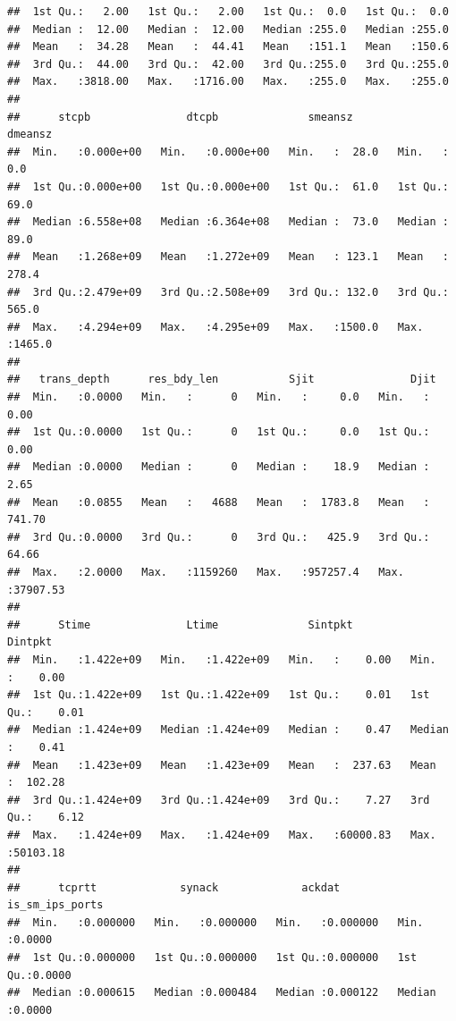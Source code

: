 \documentclass[
]{article}
\begin{document}
\begin{verbatim}
##  1st Qu.:   2.00   1st Qu.:   2.00   1st Qu.:  0.0   1st Qu.:  0.0  
##  Median :  12.00   Median :  12.00   Median :255.0   Median :255.0  
##  Mean   :  34.28   Mean   :  44.41   Mean   :151.1   Mean   :150.6  
##  3rd Qu.:  44.00   3rd Qu.:  42.00   3rd Qu.:255.0   3rd Qu.:255.0  
##  Max.   :3818.00   Max.   :1716.00   Max.   :255.0   Max.   :255.0  
##                                                                     
##      stcpb               dtcpb              smeansz          dmeansz      
##  Min.   :0.000e+00   Min.   :0.000e+00   Min.   :  28.0   Min.   :   0.0  
##  1st Qu.:0.000e+00   1st Qu.:0.000e+00   1st Qu.:  61.0   1st Qu.:  69.0  
##  Median :6.558e+08   Median :6.364e+08   Median :  73.0   Median :  89.0  
##  Mean   :1.268e+09   Mean   :1.272e+09   Mean   : 123.1   Mean   : 278.4  
##  3rd Qu.:2.479e+09   3rd Qu.:2.508e+09   3rd Qu.: 132.0   3rd Qu.: 565.0  
##  Max.   :4.294e+09   Max.   :4.295e+09   Max.   :1500.0   Max.   :1465.0  
##                                                                           
##   trans_depth      res_bdy_len           Sjit               Djit         
##  Min.   :0.0000   Min.   :      0   Min.   :     0.0   Min.   :    0.00  
##  1st Qu.:0.0000   1st Qu.:      0   1st Qu.:     0.0   1st Qu.:    0.00  
##  Median :0.0000   Median :      0   Median :    18.9   Median :    2.65  
##  Mean   :0.0855   Mean   :   4688   Mean   :  1783.8   Mean   :  741.70  
##  3rd Qu.:0.0000   3rd Qu.:      0   3rd Qu.:   425.9   3rd Qu.:   64.66  
##  Max.   :2.0000   Max.   :1159260   Max.   :957257.4   Max.   :37907.53  
##                                                                          
##      Stime               Ltime              Sintpkt            Dintpkt        
##  Min.   :1.422e+09   Min.   :1.422e+09   Min.   :    0.00   Min.   :    0.00  
##  1st Qu.:1.422e+09   1st Qu.:1.422e+09   1st Qu.:    0.01   1st Qu.:    0.01  
##  Median :1.424e+09   Median :1.424e+09   Median :    0.47   Median :    0.41  
##  Mean   :1.423e+09   Mean   :1.423e+09   Mean   :  237.63   Mean   :  102.28  
##  3rd Qu.:1.424e+09   3rd Qu.:1.424e+09   3rd Qu.:    7.27   3rd Qu.:    6.12  
##  Max.   :1.424e+09   Max.   :1.424e+09   Max.   :60000.83   Max.   :50103.18  
##                                                                               
##      tcprtt             synack             ackdat         is_sm_ips_ports 
##  Min.   :0.000000   Min.   :0.000000   Min.   :0.000000   Min.   :0.0000  
##  1st Qu.:0.000000   1st Qu.:0.000000   1st Qu.:0.000000   1st Qu.:0.0000  
##  Median :0.000615   Median :0.000484   Median :0.000122   Median :0.0000  

\end{verbatim}
\end{document}
